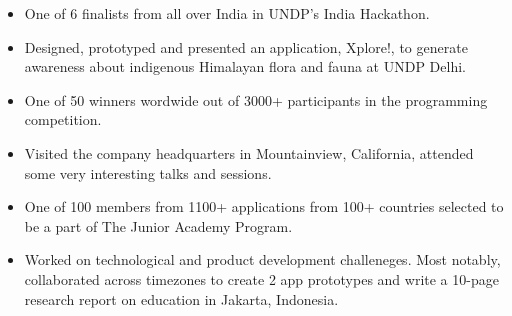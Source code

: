 \documentclass[a4paper]{resume}
\begin{document}
\begin{itemize} \vspace{-5pt} \itemsep -2pt
	\item One of 6 finalists from all over India in UNDP's India Hackathon.
	\item Designed, prototyped and presented an application, Xplore!, to generate awareness about indigenous Himalayan flora and fauna at UNDP Delhi.
\end{itemize}
\begin{itemize} \vspace{-5pt} \itemsep -2pt
	\item One of 50 winners wordwide out of 3000+ participants in the programming competition. 
	\item Visited the company headquarters in Mountainview, California, attended some very interesting talks and sessions.
\end{itemize}
\begin{itemize} \vspace{-5pt} \itemsep -2pt
	\item One of 100 members from 1100+ applications from 100+ countries selected to be a part
of The Junior Academy Program.
	\item Worked on technological and product development challeneges. Most notably, collaborated across timezones to create 2 app prototypes and write a 10-page research report on education in Jakarta, Indonesia.
\end{itemize}

\enresection
\end{document}
